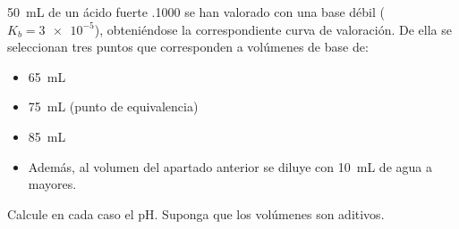 \SI{50}{\milli\liter} de un ácido fuerte  \SI{,1000}{\Molar} se han valorado con una base débil  ($K_b=\num{3e-5}$), obteniéndose la correspondiente curva de valoración. De ella se seleccionan tres puntos que corresponden a volúmenes de base de:
\begin{itemize}
	\item\SI{65}{\milli\liter}
	\item\SI{75}{\milli\liter} (punto de equivalencia)
	\item\SI{85}{\milli\liter}
	\item Además, al volumen del apartado anterior se diluye con \SI{10}{\milli\liter} de agua a mayores.
\end{itemize}
Calcule en cada caso el pH. Suponga que los volúmenes son aditivos.
